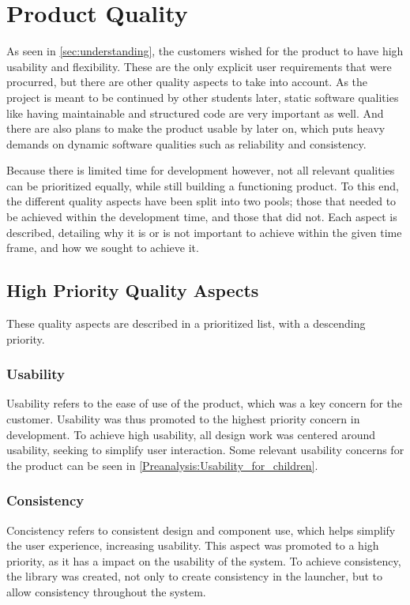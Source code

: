 \section{Product Quality}
\label{product_quality}
As seen in \autoref{sec:understanding}, the customers wished for the product to have high usability and flexibility. 
These are the only explicit user requirements that were procurred, but there are other quality aspects to take into account. 
As the project is meant to be continued by other students later, static software qualities like having maintainable and structured code are very important as well. 
And there are also plans to make the product usable by \autists[] later on, which puts heavy demands on dynamic software qualities such as reliability and consistency. \newline

Because there is limited time for development however, not all relevant qualities can be prioritized equally, while still building a functioning product. 
To this end, the different quality aspects have been split into two pools; those that needed to be achieved within the development time, and those that did not. 
Each aspect is described, detailing why it is or is not important to achieve within the given time frame, and how we sought to achieve it. 

\subsection{High Priority Quality Aspects}
These quality aspects are described in a prioritized list, with a descending priority. 

\subsubsection{Usability}
Usability refers to the ease of use of the product, which was a key concern for the customer.
Usability was thus promoted to the highest priority concern in development. 
To achieve high usability, all design work was centered around usability, seeking to simplify user interaction. 
Some relevant usability concerns for the product can be seen in \autoref{Preanalysis:Usability_for_children}.

\subsubsection{Consistency}
Concistency refers to consistent design and component use, which helps simplify the user experience, increasing usability\citep[page 90]{dieb-book}. 
This aspect was promoted to a high priority, as it has a impact on the usability of the system. 
To achieve consistency, the \guicomponents[] library was created, not only to create consistency in the launcher, but to allow consistency throughout the system. 

